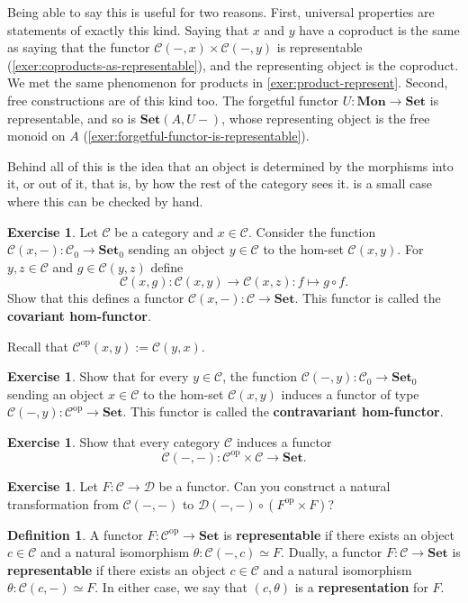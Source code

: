 \documentclass[a4paper,11pt, oneside,titlepage=false]{scrbook}
\theoremstyle{plain}
\theoremstyle{definition}
\newtheorem{dfn}[thm]{Definition}
\newtheorem{exer}[thm]{Exercise}
\newcommand{\Cat}[1]{\mathcal{#1}}
\newcommand{\CC}{\Cat{C}}
\newcommand{\DD}{\Cat{D}}
\newcommand{\Catb}[1]{\mathbf{#1}}
\newcommand{\SET}{\Catb{Set}}
\newcommand{\MON}{\Catb{Mon}}
\newcommand{\Ob}[1]{{#1}_0}
\newcommand{\op}[1]{\ensuremath{{#1}^\text{op}}}
\begin{document}
Being able to say this is useful for two reasons.
First, universal properties are statements of exactly this kind.
Saying that $x$ and $y$ have a coproduct is the same as saying that the functor
$\CC(-,x)\times\CC(-,y)$ is representable
(\cref{exer:coproducts-as-representable}), and the representing object is the
coproduct.
We met the same phenomenon for products in \cref{exer:product-represent}.
Second, free constructions are of this kind too.
The forgetful functor $U : \MON\to\SET$ is representable, and so is
$\SET(A,U-)$, whose representing object is the free monoid on $A$
(\cref{exer:forgetful-functor-is-representable}).

Behind all of this is the idea that an object is determined by the morphisms
into it, or out of it, that is, by how the rest of the category sees it.
 is a small case where this can be checked
by hand.

\begin{exer}
\label{exer:covariant-hom}
Let $\CC$ be a category and $x \in \CC$.
Consider the function $\CC(x,-) : \Ob{\CC} \to \Ob{\SET}$ sending an object $y \in \CC$ to the hom-set $\CC(x,y)$.
For $y, z \in \CC$ and $g \in \CC(y, z)$ define
\[
\CC(x, g) : \CC(x,y) \to \CC(x,z) : f \mapsto g \circ f.
\]
Show that this defines a functor $\CC(x,-) : \CC \to \SET$.
This functor is called the \textbf{covariant hom-functor}.
\end{exer}

Recall that $\op{\CC}(x,y) := \CC(y,x)$.

\begin{exer}
\label{exer:contravariant-hom}
Show that for every $y \in \CC$, the function $\CC(-,y) : \Ob{\CC} \to \Ob{\SET}$ sending an object $x \in \CC$ to the hom-set $\CC(x,y)$ induces a functor of type $\CC(-,y) : \op{\CC} \to \SET$.
This functor is called the \textbf{contravariant hom-functor}.
\end{exer}

\begin{exer}
Show that every category $\CC$ induces a functor
\[
\CC(-,-) : \op{\CC} \times \CC \to \SET.
\]
\end{exer}

\begin{exer}
Let $F : \CC \to \DD$ be a functor.
Can you construct a natural transformation from $\CC(-,-)$ to $\DD(-,-) \circ ({\op{F} \times F})$?
\end{exer}

\begin{dfn}
A functor $F : \op{\CC} \to \SET$ is \textbf{representable} if there exists an object $c \in \CC$ and a natural isomorphism $\theta : \CC(-,c) \simeq F$.
Dually, a functor $F : \CC \to \SET$ is \textbf{representable} if there exists an object $c \in \CC$ and a natural isomorphism $\theta : \CC(c,-) \simeq F$.
In either case, we say that $(c, \theta)$ is a \textbf{representation} for $F$.
\end{dfn}
\end{document}
